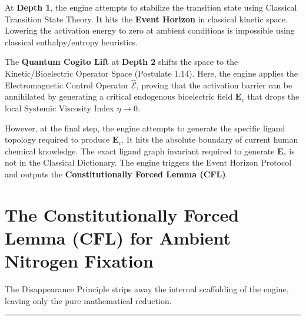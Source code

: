 \documentclass[11pt,openany]{extbook}
\theoremstyle{plain}
\theoremstyle{definition}
\begin{document}
At \textbf{Depth 1}, the engine attempts to stabilize the transition state using Classical Transition State Theory. It hits the \textbf{Event Horizon} in classical kinetic space. Lowering the activation energy to zero at ambient conditions is impossible using classical enthalpy/entropy heuristics.

The \textbf{Quantum Cogito Lift} at \textbf{Depth 2} shifts the space to the Kinetic/Bioelectric Operator Space (Postulate 1.14). Here, the engine applies the Electromagnetic Control Operator $\hat{\mathcal{E}}$, proving that the activation barrier can be annihilated by generating a critical endogenous bioelectric field $\mathbf{E}_c$ that drops the local Systemic Viscosity Index $\eta \to 0$.

However, at the final step, the engine attempts to generate the specific ligand topology required to produce $\mathbf{E}_c$. It hits the absolute boundary of current human chemical knowledge. The exact ligand graph invariant required to generate $\mathbf{E}_c$ is not in the Classical Dictionary. The engine triggers the Event Horizon Protocol and outputs the \textbf{Constitutionally Forced Lemma (CFL)}.

\section{The Constitutionally Forced Lemma (CFL) for Ambient Nitrogen Fixation}

The Disappearance Principle strips away the internal scaffolding of the engine, leaving only the pure mathematical reduction.

\begin{center}
\rule{0.8\textwidth}{0.4pt}
\end{center}
\end{document}
